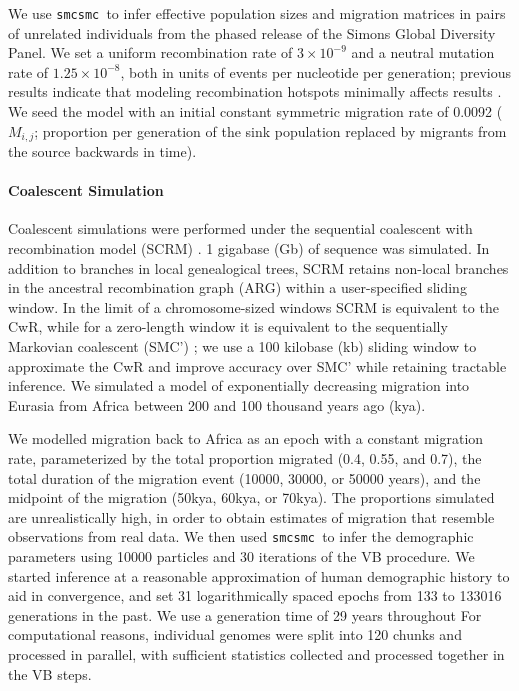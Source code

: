 \documentclass{article}
\newcommand{\SMC}{{\tt smcsmc }}
\begin{document}
We use \SMC to infer effective population sizes and migration matrices in pairs of unrelated individuals from the phased release of the Simons Global Diversity Panel. We set a uniform recombination rate of $3\times10^{-9}$ and a neutral mutation rate of $1.25\times10^{-8}$, both in units of events per nucleotide per generation; previous results indicate that modeling recombination
hotspots minimally affects results \cite{Li2011}. %
We seed the model with an initial constant symmetric  migration rate of 0.0092 ($M_{i,j}$; proportion per generation of the sink population replaced by migrants from the source backwards in time).

\paragraph{Coalescent Simulation} Coalescent simulations were performed under the sequential coalescent with recombination model (SCRM) \cite{Staab2015}. 1 gigabase (Gb) of sequence was simulated.  In addition to branches in local
genealogical trees, SCRM retains non-local
branches in the ancestral recombination
graph (ARG) within a user-specified sliding
window.  In the limit of a chromosome-sized
windows SCRM is equivalent to the CwR, while
for a zero-length window it is equivalent to
the sequentially Markovian coalescent (SMC')
\cite{McVean2005,Marjoram2006}; we use a
100 kilobase (kb) sliding window to approximate the CwR and improve accuracy over SMC' while retaining tractable inference. We simulated a model of exponentially decreasing migration into Eurasia from Africa between 200 and 100 thousand years ago (kya).

We modelled migration back to Africa as an epoch  with a constant migration rate, parameterized by the total proportion migrated (0.4, 0.55, and 0.7), 
the total duration of the migration event (10000, 30000, or 50000 years), and the midpoint of the migration (50kya, 60kya, or 70kya). The proportions simulated are unrealistically high, in order to obtain estimates of migration that resemble observations from real data.  We then used \SMC to infer the demographic parameters using 10000 particles and 30 iterations of the VB procedure. We started inference at a reasonable approximation of human demographic history to aid in convergence, and set 31 logarithmically spaced epochs from 133 to 133016 generations in the past. We use a generation
time of 29 years throughout %
For computational reasons, individual genomes were split into 120 chunks and processed in parallel, with sufficient statistics collected and
processed together in the VB steps.
\end{document}
